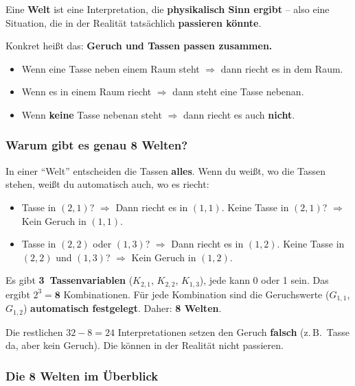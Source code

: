 \documentclass[a4paper,12pt]{article}
\begin{document}
\begin{merkbox}[title={Definition: Welt}]
Eine \textbf{Welt} ist eine Interpretation, die \textbf{physikalisch
Sinn ergibt} -- also eine Situation, die in der Realit\"at tats\"achlich
\textbf{passieren k\"onnte}.

\medskip
Konkret hei\ss t das: \textbf{Geruch und Tassen passen zusammen.}
\begin{itemize}
\item Wenn eine Tasse neben einem Raum steht $\Rightarrow$ dann riecht
      es in dem Raum.
\item Wenn es in einem Raum riecht $\Rightarrow$ dann steht eine Tasse
      nebenan.
\item Wenn \textbf{keine} Tasse nebenan steht $\Rightarrow$ dann riecht
      es auch \textbf{nicht}.
\end{itemize}
\end{merkbox}

\subsubsection*{Warum gibt es genau 8 Welten?}

In einer "`Welt"' entscheiden die Tassen \textbf{alles}. Wenn du
wei\ss t, wo die Tassen stehen, wei\ss t du automatisch auch,
wo es riecht:

\begin{itemize}
\item Tasse in $(2{,}1)$? $\Rightarrow$ Dann riecht es in $(1{,}1)$.
      Keine Tasse in $(2{,}1)$? $\Rightarrow$ Kein Geruch in $(1{,}1)$.
\item Tasse in $(2{,}2)$ oder $(1{,}3)$? $\Rightarrow$ Dann riecht es
      in $(1{,}2)$.
      Keine Tasse in $(2{,}2)$ und $(1{,}3)$? $\Rightarrow$ Kein Geruch
      in $(1{,}2)$.
\end{itemize}

Es gibt \textbf{3~Tassenvariablen} ($K_{2,1}$, $K_{2,2}$, $K_{1,3}$),
jede kann 0 oder 1 sein. Das ergibt $2^3 = \mathbf{8}$ Kombinationen.
F\"ur jede Kombination sind die Geruchswerte ($G_{1,1}$, $G_{1,2}$)
\textbf{automatisch festgelegt}. Daher: \textbf{8 Welten}.

\medskip
Die restlichen $32 - 8 = 24$ Interpretationen setzen den Geruch
\textbf{falsch} (z.\,B.\ Tasse da, aber kein Geruch). Die k\"onnen
in der Realit\"at nicht passieren.

\subsubsection*{Die 8 Welten im \"Uberblick}
\end{document}
